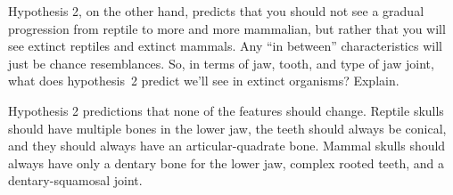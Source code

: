 \documentclass[12pt, hidelinks]{exam}
\newcommand*\AnswerBox[2]{%
    \parbox[t][#1]{0.92\textwidth}{%
    \begin{solution}#2\end{solution}}
}
\begin{document}
\begin{questions}
\question
Hypothesis 2, on the other hand, predicts that you should not see a gradual progression from reptile to more and more mammalian, but rather that you will see extinct reptiles and extinct mammals.  Any ``in between'' characteristics will just be chance resemblances.  So, in terms of jaw, tooth,  and type of jaw joint, what does hypothesis~2 predict we'll see in extinct organisms?  Explain.

\AnswerBox{4\baselineskip}{%
Hypothesis 2 predictions that none of the features should change. Reptile skulls should have multiple bones in the lower jaw, the teeth should always be conical, and they should always have an articular-quadrate bone. Mammal skulls should always have only a dentary bone for the lower jaw, complex rooted teeth, and a dentary-squamosal joint.}


\end{questions}
\end{document}

